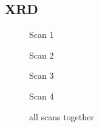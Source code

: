 \subsection{XRD}
\begin{figure}[h!]
	\centering
	
    	\caption{Scan 1}
	\label{fig:unknownScan}
\end{figure}

\begin{figure}[h!]
	\centering
	
    	\caption{Scan 2}
	\label{fig:unknownScan}
\end{figure}

\begin{figure}[h!]
	\centering
	
    	\caption{Scan 3}
	\label{fig:unknownScan}
\end{figure}

\begin{figure}[h!]
	\centering
	
    	\caption{Scan 4}
	\label{fig:unknownScan}
\end{figure}

\begin{figure}[h!]
	\centering
	
    	\caption{all scans together}
	\label{fig:unknownScan}
\end{figure}